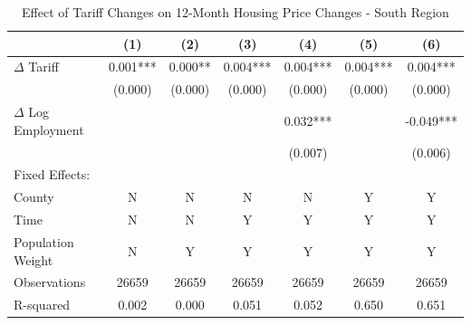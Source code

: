 \begin{table}[htbp]
\centering
\caption{Effect of Tariff Changes on 12-Month Housing Price Changes - South Region}
\label{tab:tariffs_changes_south}
\begin{tabular}{lcccccc}
\toprule
{} &       (1) &      (2) &       (3) &       (4) &       (5) &        (6) \\
\midrule
$\Delta$ Tariff  &   0.001*** &    0.000** &    0.004*** &    0.004*** &    0.004*** &    0.004*** \\
                 &    (0.000) &   (0.000) &   (0.000) &   (0.000) &   (0.000) &   (0.000) \\
$\Delta$ Log Employment  &           &           &           &  0.032*** &           &  -0.049*** \\
                  &           &           &           &   (0.007) &           &   (0.006) \\
Fixed Effects:    &           &           &           &           &           &           \\
County           &         N &        N &        N &        N &        Y &        Y \\
Time             &        N &         N &         Y &         Y &         Y &         Y \\
Population Weight &        N &         Y &         Y &         Y &         Y &         Y \\
\midrule
Observations     &     26659 &      26659 &      26659 &      26659 &      26659 &      26659 \\
R-squared        &     0.002 &     0.000 &     0.051 &     0.052 &     0.650 &     0.651 \\
\bottomrule
\end{tabular}
\end{table}
\FloatBarrier